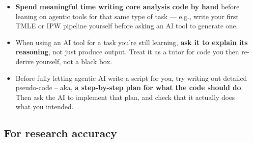 \documentclass[
]{book}
\providecommand{\tightlist}{%
  \setlength{\itemsep}{0pt}\setlength{\parskip}{0pt}}
\begin{document}
\begin{itemize}
\tightlist
\item
  \textbf{Spend meaningful time writing core analysis code by hand} before
  leaning on agentic tools for that same type of task --- e.g., write your
  first TMLE or IPW pipeline yourself before asking an AI tool to
  generate one.
\item
  When using an AI tool for a task you're still learning, \textbf{ask it to
  explain its reasoning}, not just produce output. Treat it as a tutor
  for code you then re-derive yourself, not a black box.
\item
  Before fully letting agentic AI write a script for you, try writing
  out detailed pseudo-code -- aka, \textbf{a step-by-step plan for what the
  code should do}. Then ask the AI to implement that plan, and check
  that it actually does what you intended.
\end{itemize}

\subsection{For research accuracy}\label{for-research-accuracy}
\end{document}

